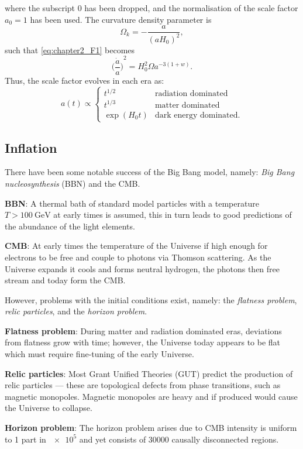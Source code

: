 %
where the subscript \(0\) has been dropped, and the normalisation of the scale factor \(a_{0}=1\) has been used.
The curvature density parameter is
%
\begin{equation}
	\Omega_{k}
	= -\frac{a}{{(aH_{0})}^{2}},
\end{equation}
%
such that \cref{eq:chapter2_F1} becomes
%
\begin{equation}
	{\bigg(\frac{\dot{a}}{a}\bigg)}^{2}
	= H_{0}^{2} \Omega a^{-3(1+w)}.
\end{equation}
%
Thus, the scale factor evolves in each era as:
%
\begin{equation}
	a(t) \propto
	\begin{cases}
		t^{1/2}      & \text{radiation dominated}    \\
		t^{1/3}      & \text{matter dominated}       \\
		\exp(H_{0}t) & \text{dark energy dominated}.
	\end{cases}
\end{equation}

\subsection{Inflation}\label{sec:chapter2_inflation}

There have been some notable success of the Big Bang model, namely: \emph{Big Bang nucleosynthesis} (BBN) and the CMB\@.

\begin{hangparas}{24pt}{1}
	\textbf{BBN}:
	A thermal bath of standard model particles with a temperature \(T > \SI{100}{\giga\eV}\) at early times is assumed, this in turn leads to good predictions of the abundance of the light elements.

	\textbf{CMB}:
	At early times the temperature of the Universe if high enough for electrons to be free and couple to photons via Thomson scattering.
	As the Universe expands it cools and forms neutral hydrogen, the photons then free stream and today form the CMB\@.
\end{hangparas}

\noindent
However, problems with the initial conditions exist, namely: the \emph{flatness problem}, \emph{relic particles}, and the \emph{horizon problem}.

\begin{hangparas}{24pt}{1}
	\textbf{Flatness problem}:
	During matter and radiation dominated eras, deviations from flatness grow with time; however, the Universe today appears to be flat which must require fine-tuning of the early Universe.

	\textbf{Relic particles}:
	Most Grant Unified Theories (GUT) predict the production of relic particles --- these are topological defects from phase transitions, such as magnetic monopoles.
	Magnetic monopoles are heavy and if produced would cause the Universe to collapse.

	\textbf{Horizon problem}:
	The horizon problem arises due to CMB intensity is uniform to 1 part in \(\num{e5}\) and yet consists of \(\num{30000}\) causally disconnected regions.
\end{hangparas}

